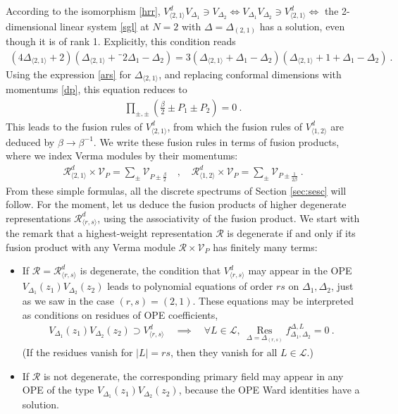 \documentclass[12pt, a4paper]{article}
\theoremstyle{break}
\begin{document}
According to the isomorphism \eqref{hrr}, $V^d_{\langle 2,1\rangle} V_{\Delta_1} \ni V_{\Delta_2} \iff V_{\Delta_1}V_{\Delta_2} \ni V^d_{\langle 2,1\rangle} \iff $ the 2-dimensional linear system \eqref{sgl} at $N=2$ with $\Delta=\Delta_{(2,1)}$ has a solution, even though it is of rank 1. Explicitly, this condition reads
\begin{align}
 \left(4\Delta_{\langle 2,1\rangle}+2\right) \left(\Delta_{\langle 2,1\rangle}+¨2\Delta_1-\Delta_2\right) = 3\left(\Delta_{\langle 2,1\rangle}+\Delta_1-\Delta_2\right)\left(\Delta_{\langle 2,1\rangle}+1+\Delta_1-\Delta_2\right)\ .
\end{align}
Using the expression \eqref{ars} for $\Delta_{\langle 2,1\rangle}$, and replacing conformal dimensions with momentums \eqref{dp}, this equation reduces to 
\begin{align}
 \prod_{\pm,\pm}\left(\tfrac{\beta}{2}\pm P_1\pm P_2\right) = 0\ . 
\end{align}
This leads to the fusion rules of $V^d_{\langle 2,1\rangle}$, from which the fusion rules of $V^d_{\langle 1,2\rangle}$ are deduced by $\beta\to \beta^{-1}$. We write these fusion rules in terms of fusion products, where we index Verma modules by their momentums:
\begin{align}
 \boxed{\mathcal{R}^d_{\langle 2,1\rangle}\times \mathcal{V}_P = \sum_\pm \mathcal{V}_{P\pm \frac{\beta}{2}}} \quad, \quad \boxed{\mathcal{R}^d_{\langle 1,2\rangle}\times \mathcal{V}_P = \sum_\pm \mathcal{V}_{P\pm \frac{1}{2\beta}}}\ . 
 \label{rvvp}
\end{align}
From these simple formulas, all the discrete spectrums of Section \ref{sec:sesc} will follow. For the moment, let us deduce the fusion products of higher degenerate representations $\mathcal{R}^d_{\langle r,s\rangle}$, using the associativity of the fusion product. We start with the remark that a highest-weight representation $\mathcal{R}$ is degenerate if and only if its fusion product with any Verma module $\mathcal{R}\times \mathcal{V}_P$ has finitely many terms:
\begin{itemize}
 \item If $\mathcal{R}=\mathcal{R}^d_{\langle r,s\rangle}$ is degenerate, the condition that $V^d_{\langle r,s\rangle}$ may appear in the OPE $V_{\Delta_1}(z_1)V_{\Delta_2}(z_2)$ leads to polynomial equations of order $rs$ on $\Delta_1,\Delta_2$, just as we saw in the case $(r,s)=(2,1)$. These equations may be interpreted as conditions on residues of OPE coefficients,
 \begin{align}
  V_{\Delta_1}(z_1)V_{\Delta_2}(z_2) \supset V^d_{\langle r,s\rangle} \quad \implies \quad \forall L\in \mathcal{L},\ \underset{\Delta=\Delta_{(r,s)}}{\operatorname{Res}} f^{\Delta,L}_{\Delta_1,\Delta_2} = 0\ .
 \end{align}
 (If the residues vanish for $|L|=rs$, then they vanish for all $L\in\mathcal{L}$.)
 \item If $\mathcal{R}$ is not degenerate, the corresponding primary field may appear in any OPE of the type $V_{\Delta_1}(z_1)V_{\Delta_2}(z_2)$, because the OPE Ward identities have a solution. 
\end{itemize}
\end{document}
